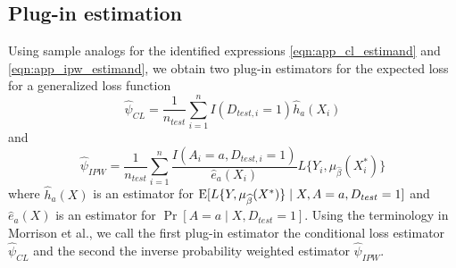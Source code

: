     \subsection{Plug-in estimation}
    Using sample analogs for the identified expressions \ref{eqn:app_cl_estimand} and \ref{eqn:app_ipw_estimand}, we obtain two plug-in estimators for the expected loss for a generalized loss function
    \begin{equation*}
        \widehat{\psi}_{CL} = \frac{1}{n_{test}}\sum_{i=1}^nI(D_{test, i} = 1)\widehat{h}_a(X_i)
    \end{equation*}
    and 
    \begin{equation*}
        \widehat{\psi}_{IPW} = \frac{1}{n_{test}} \sum_{i=1}^n \frac{I(A_i = a, D_{test, i} = 1)}{ \widehat{e}_a(X_i)} L\{Y_i, \mu_{\widehat{\beta}}(X^*_i)\}
    \end{equation*}
    where $\widehat{h}_a(X)$ is an estimator for $\operatorname{E}[L\{Y, \mu_{\widehat{\beta}}(X^*)\}\mid X,A = a, D_{test} = 1]$ and $\widehat{e}_a(X)$ is an estimator for $\Pr[A = a \mid X,D_{test} = 1]$. Using the terminology in Morrison et al., we call the first plug-in estimator the conditional loss estimator $ \widehat{\psi}_{CL}$ and the second the inverse probability weighted estimator $\widehat{\psi}_{IPW}$. 


